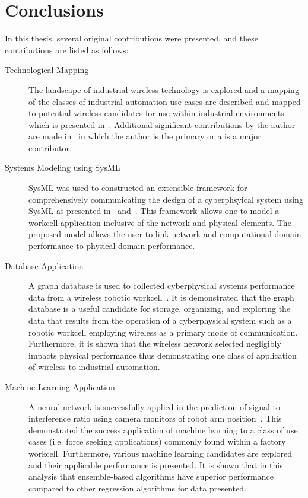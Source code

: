
\chapter{Conclusions}

In this thesis, several original contributions were presented, and these contributions are listed as follows:

\begin{description}
	\item[Technological Mapping] The landscape of industrial wireless technology is explored and a mapping of the classes of industrial automation use cases are described and mapped to potential wireless candidates for use within industrial environments which is presented in~\cite{CandellRW2017}.  Additional significant contributions by the author are made in~\cite{Candell2018.IWSGuide, Candell2017.SAS.IWSWorkshopReport, Montgomery2019} in which the author is the primary or a is a major contributor.
	
	\item[Systems Modeling using SysML] SysML was used to constructed an extensible framework for comprehensively communicating the design of a cyberphsyical system using SysML as presented in~\cite{SysML.Candell2018} and~\cite{Candell2018SysML.DATA}.  This framework allows one to model a workcell application inclusive of the network and physical elements.  The proposed model allows the user to link network and computational domain performance to physical domain performance.
	
	\item[Database Application] A graph database is used to collected cyberphysical systems performance data from a wireless robotic workcell~\cite{CandellISIT2020.Conf}.  It is demonstrated that the graph database is a useful candidate for storage, organizing, and exploring the data that results from the operation of a cyberphysical system such as a robotic workcell employing wireless as a primary mode of communication.  Furthermore, it is shown that the wireless network selected negligibly impacts physical performance thus demonstrating one class of application of wireless to industrial automation.
	
	\item[Machine Learning Application] A neural network is successfully applied in the prediction of signal-to-interference ratio using camera monitors of robot arm position~\cite{CandellISIE2019.Conf, CandellIJAMT2020.Jrml}.  This demonstrated the success application of machine learning to a class of use cases (i.e. force seeking applications) commonly found within a factory workcell.  Furthermore, various machine learning candidates are explored and their applicable performance is presented.  It is shown that in this analysis that ensemble-based algorithms have superior performance compared to other regression algorithms for data presented.  
\end{description}

